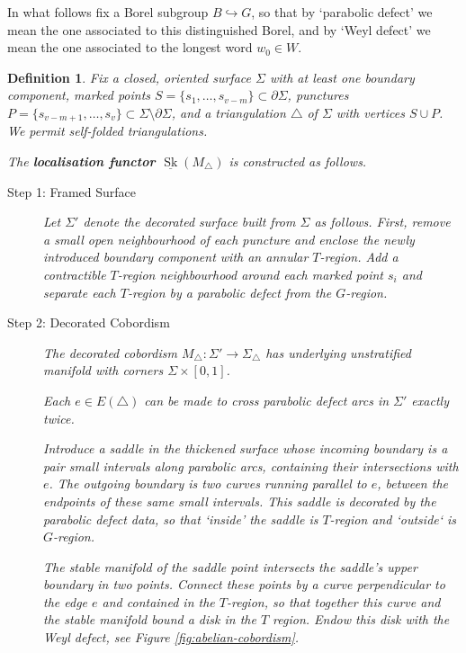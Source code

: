 \documentclass[a4paper]{article}
\numberwithin{equation}{section}
\newtheorem{definition}[counter]{Definition}
\newcommand{\1}{{\mathrm{1}\mkern-4mu{\mathchoice{}{}{\mskip-0.5mu}{\mskip-1mu}}\mathrm{l}}}
\DeclareMathOperator{\Sk}{Sk}
\begin{document}
In what follows fix a Borel subgroup $B \hookrightarrow G$, so that by `parabolic defect' we mean the one associated to this distinguished Borel, and by `Weyl defect' we mean the one associated to the longest word $w_0 \in W$.

\begin{definition}\label{def:skein-cluster-functor}
Fix a closed, oriented surface $\Sigma$ with at least one boundary component, marked points $S = \{s_1,\ldots,s_{v-m}\} \subset \partial \Sigma$, punctures $P = \{s_{v-m+1},\ldots,s_{v}\} \subset \Sigma\setminus\partial \Sigma$, and a triangulation $\triangle$ of $\Sigma$ with vertices $S\cup P$.
We permit self-folded triangulations.

The \emph{\bf localisation functor $\underline{\Sk}(M_\triangle)$} is constructed as follows.

\begin{description}
\item[Step 1: Framed Surface]
   Let $\Sigma'$ denote the decorated surface built from $\Sigma$ as follows. First, remove a small open neighbourhood of each puncture and enclose the newly introduced boundary component with an annular $T$-region.
    Add a contractible $T$-region neighbourhood around each marked point $s_i$ and separate each $T$-region by a parabolic defect from the $G$-region.
    
    \item[Step 2: Decorated Cobordism] 
The decorated cobordism $M_{\triangle} : \Sigma' \to \Sigma_\triangle$ has underlying unstratified manifold with corners $\Sigma \times [0,1]$.

Each $e\in E(\triangle)$ can be made to cross parabolic defect arcs in $\Sigma'$ exactly twice.

Introduce a saddle in the thickened surface whose incoming boundary is a pair small intervals along parabolic arcs, containing their intersections with $e$. The outgoing boundary is two curves running parallel to $e$, between the endpoints of these same small intervals.
This saddle is decorated by the parabolic defect data, so that `inside' the saddle is $T$-region and `outside` is $G$-region.

The stable manifold of the saddle point intersects the saddle's upper boundary in two points.
Connect these points by a curve perpendicular to the edge $e$ and contained in the $T$-region, so that together this curve and the stable manifold bound a disk in the $T$ region. 
Endow this disk with the Weyl defect, see Figure \ref{fig:abelian-cobordism}.


\end{description}
\end{definition}
\end{document}
